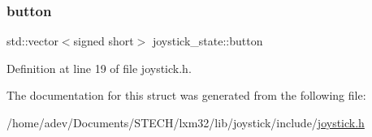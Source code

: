 \subsubsection{\texorpdfstring{button}{button}}
{\footnotesize\ttfamily std\+::vector$<$signed short$>$ joystick\+\_\+state\+::button}



Definition at line 19 of file joystick.\+h.



The documentation for this struct was generated from the following file\+:\begin{DoxyCompactItemize}
\item 
/home/adev/\+Documents/\+S\+T\+E\+C\+H/lxm32/lib/joystick/include/\hyperlink{joystick_8h}{joystick.\+h}\end{DoxyCompactItemize}
